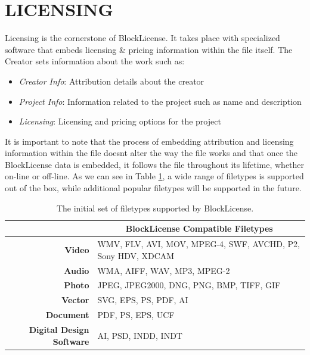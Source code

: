 
\section{LICENSING} \label{licensing}

Licensing is the cornerstone of BlockLicense. It takes place with specialized software that embeds licensing \& pricing information within the file itself.  The Creator sets information about the work such as:

\begin{itemize}
\item \textit{Creator Info}: Attribution details about the creator 
\item \textit{Project Info}: Information related to the project such as name and description
\item \textit{Licensing}: Licensing and pricing options for the project
\end{itemize}

It is important to note that the process of embedding attribution and licensing information within the file doesn\textquotesingle t alter the way the file works and that  once the BlockLicense data is embedded, it follows the file throughout its lifetime, whether on-line or off-line. As we can see in Table \ref{table:filetypes}, a wide range of filetypes is supported out of the box, while additional popular filetypes will be supported in the future. 

\begin{table}[t]
\centering
\begin{tabular}{@{}rl@{}}
\toprule
\multicolumn{1}{l}{}             & \multicolumn{1}{c}{\textbf{BlockLicense Compatible Filetypes}}         \\ \midrule
\textbf{Video}                   & WMV, FLV, AVI, MOV, MPEG-4, SWF, AVCHD, P2, Sony HDV, XDCAM \\
\textbf{Audio}                   & WMA, AIFF, WAV, MP3, MPEG-2                                 \\
\textbf{Photo}                   & JPEG, JPEG2000, DNG, PNG, BMP, TIFF, GIF                    \\
\textbf{Vector}                  & SVG, EPS, PS, PDF, AI                                       \\
\textbf{Document}                & PDF, PS, EPS, UCF                                           \\
\textbf{Digital Design Software} & AI,  PSD, INDD, INDT                                        \\ \bottomrule
\end{tabular}
\caption{The initial set of filetypes supported by BlockLicense.}
\label{table:filetypes}
\end{table}

